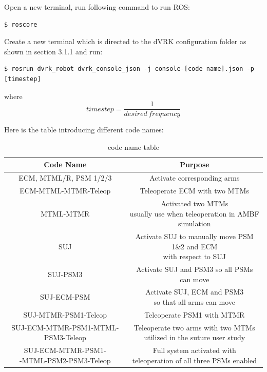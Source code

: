 Open a new terminal, run following command to run ROS:

\begin{verbatim}
$ roscore
\end{verbatim}

Create a new terminal which is directed to the dVRK configuration folder as shown in section 3.1.1 and run:

\begin{verbatim}
$ rosrun dvrk_robot dvrk_console_json -j console-[code name].json -p [timestep]
\end{verbatim}
where
\begin{equation*}
    timestep = \frac{1}{desired \, frequency}
\end{equation*}

Here is the table introducing different code names:

\begin{table}[H]
    \centering
    \begin{tabular}{|c|c|}
    \hline
    Code Name & Purpose \\
    \hline
    ECM, MTML/R, PSM 1/2/3 & Activate corresponding arms \\
    \hline
    ECM-MTML-MTMR-Teleop & Teleoperate ECM with two MTMs \\
    \hline
    MTML-MTMR & \makecell{Activated two MTMs \\ usually use when teleoperation in AMBF simulation \cite{munawar2022open}} \\
    \hline
    SUJ & \makecell{Activate SUJ to manually move PSM 1\&2 and ECM \\ with respect to SUJ}\\
    \hline
    SUJ-PSM3 & Activate SUJ and PSM3 so all PSMs can move\\
    \hline
    SUJ-ECM-PSM & \makecell{Activate SUJ, ECM and PSM3 \\ so that all arms can move} \\
    \hline
    SUJ-MTMR-PSM1-Teleop & Teleoperate PSM1 with MTMR \\
    \hline
    SUJ-ECM-MTMR-PSM1-MTML-PSM3-Teleop & \makecell{Teleoperate two arms with two MTMs \\ utilized in the suture user study} \\
    \hline
    \makecell{SUJ-ECM-MTMR-PSM1-\\-MTML-PSM2-PSM3-Teleop} & \makecell{Full system activated with \\  teleoperation of all three PSMs enabled}  \\
    \hline
    \end{tabular}
    \caption{code name table}
    \label{tab:code_name}
\end{table}


